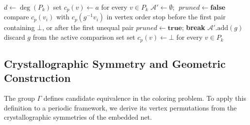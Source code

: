 \documentclass[a5paper, 10pt]{article}
\begin{document}
\begin{algorithm}
\begin{algorithmic}[1]
            \EndIf
        \EndIf
        \State \Return
    \EndIf
    \State $d \gets \deg(P_k)$
        \State set $c_p(v)\gets a$ for every $v\in P_k$
        \State $\mathcal{A}' \gets \emptyset$; $\;pruned \gets \textbf{false}$
            \State compare $c_p(v_i)$ with $c_p(g^{-1}v_i)$ in vertex order
            \State stop before the first pair containing $\bot$, or after the first unequal pair
                \State $pruned \gets \textbf{true}$; \textbf{break}
                \State $\mathcal{A}'.\text{add}(g)$
            \Else
                \State discard $g$ from the active comparison set
            \EndIf
        \EndFor
            \State {}
        \EndIf
        \State set $c_p(v)\gets\bot$ for every $v\in P_k$
    \EndFor
\EndFunction
\end{algorithmic}
\end{algorithm}

\subsection{Crystallographic Symmetry and Geometric Construction}



\label{sec:reconstruction_method}
The group $\Gamma$ defines candidate equivalence in the coloring problem. To apply this definition to a periodic framework, we derive its vertex permutations from the crystallographic symmetries of the embedded net.
\end{document}
